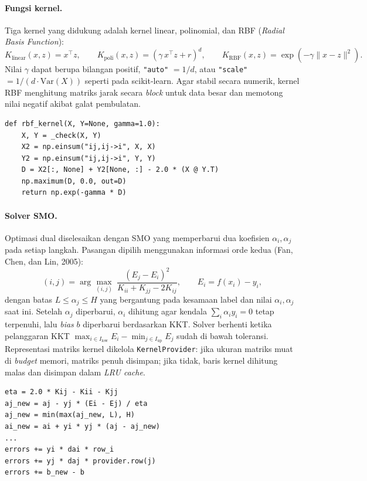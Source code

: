 \paragraph{Fungsi kernel.}
Tiga kernel yang didukung adalah kernel linear, polinomial, dan RBF
(\textit{Radial Basis Function}):
\[
K_{\text{linear}}(x,z)=x^\top z,\qquad
K_{\text{poli}}(x,z)=(\gamma\,x^\top z + r)^d,\qquad
K_{\text{RBF}}(x,z)=\exp(-\gamma\lVert x-z\rVert^2).
\]
Nilai $\gamma$ dapat berupa bilangan positif, \texttt{"auto"} $=1/d$, atau
\texttt{"scale"} $=1/(d\cdot\mathrm{Var}(X))$ seperti pada scikit-learn. Agar
stabil secara numerik, kernel RBF menghitung matriks jarak secara \textit{block}
untuk data besar dan memotong nilai negatif akibat galat pembulatan.
\begin{lstlisting}
def rbf_kernel(X, Y=None, gamma=1.0):
    X, Y = _check(X, Y)
    X2 = np.einsum("ij,ij->i", X, X)
    Y2 = np.einsum("ij,ij->i", Y, Y)
    D = X2[:, None] + Y2[None, :] - 2.0 * (X @ Y.T)
    np.maximum(D, 0.0, out=D)
    return np.exp(-gamma * D)
\end{lstlisting}

\paragraph{Solver SMO.}
Optimasi dual diselesaikan dengan SMO yang memperbarui dua koefisien
$\alpha_i,\alpha_j$ pada setiap langkah. Pasangan dipilih menggunakan informasi
orde kedua (Fan, Chen, dan Lin, 2005):
\[
(i,j) = \arg\max_{(i,j)}\ \frac{(E_j - E_i)^2}
{K_{ii} + K_{jj} - 2K_{ij}},
\qquad E_i = f(x_i) - y_i,
\]
dengan batas $L \le \alpha_j \le H$ yang bergantung pada kesamaan label dan
nilai $\alpha_i,\alpha_j$ saat ini. Setelah $\alpha_j$ diperbarui,
$\alpha_i$ dihitung agar kendala $\sum_i \alpha_i y_i = 0$ tetap terpenuhi,
lalu \textit{bias} $b$ diperbarui berdasarkan KKT. Solver berhenti ketika
pelanggaran KKT $\max_{i\in I_{\text{low}}} E_i - \min_{j\in I_{\text{up}}} E_j$
sudah di bawah toleransi. Representasi matriks kernel dikelola
\texttt{KernelProvider}: jika ukuran matriks muat di \textit{budget} memori,
matriks penuh disimpan; jika tidak, baris kernel dihitung malas dan disimpan
dalam \textit{LRU cache}.
\begin{lstlisting}
eta = 2.0 * Kij - Kii - Kjj
aj_new = aj - yj * (Ei - Ej) / eta
aj_new = min(max(aj_new, L), H)
ai_new = ai + yi * yj * (aj - aj_new)
...
errors += yi * dai * row_i
errors += yj * daj * provider.row(j)
errors += b_new - b
\end{lstlisting}

